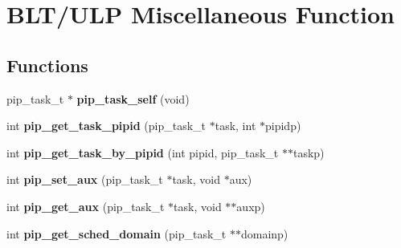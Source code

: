 \hypertarget{group__ulp-6-misc}{\section{B\-L\-T/\-U\-L\-P Miscellaneous Function}
\label{group__ulp-6-misc}
}
\subsection*{Functions}
\begin{DoxyCompactItemize}
\item 
\hypertarget{group__ulp-6-misc_gaf09a1abfd580696c74d4aa7be8255ad0}{pip\-\_\-task\-\_\-t $\ast$ {\bfseries pip\-\_\-task\-\_\-self} (void)}\label{group__ulp-6-misc_gaf09a1abfd580696c74d4aa7be8255ad0}

\item 
\hypertarget{group__ulp-6-misc_ga14a1b03ec6564885a5dd97dbc27167aa}{int {\bfseries pip\-\_\-get\-\_\-task\-\_\-pipid} (pip\-\_\-task\-\_\-t $\ast$task, int $\ast$pipidp)}\label{group__ulp-6-misc_ga14a1b03ec6564885a5dd97dbc27167aa}

\item 
\hypertarget{group__ulp-6-misc_ga147decca4226959d822b73b7c31a4465}{int {\bfseries pip\-\_\-get\-\_\-task\-\_\-by\-\_\-pipid} (int pipid, pip\-\_\-task\-\_\-t $\ast$$\ast$taskp)}\label{group__ulp-6-misc_ga147decca4226959d822b73b7c31a4465}

\item 
\hypertarget{group__ulp-6-misc_gacfd984207deedf86edddbb72c5d4e883}{int {\bfseries pip\-\_\-set\-\_\-aux} (pip\-\_\-task\-\_\-t $\ast$task, void $\ast$aux)}\label{group__ulp-6-misc_gacfd984207deedf86edddbb72c5d4e883}

\item 
\hypertarget{group__ulp-6-misc_ga8bf51911ca0b18340b29fae90ab59b03}{int {\bfseries pip\-\_\-get\-\_\-aux} (pip\-\_\-task\-\_\-t $\ast$task, void $\ast$$\ast$auxp)}\label{group__ulp-6-misc_ga8bf51911ca0b18340b29fae90ab59b03}

\item 
\hypertarget{group__ulp-6-misc_ga32119e3a41a4073b52ade76bf87a5589}{int {\bfseries pip\-\_\-get\-\_\-sched\-\_\-domain} (pip\-\_\-task\-\_\-t $\ast$$\ast$domainp)}\label{group__ulp-6-misc_ga32119e3a41a4073b52ade76bf87a5589}

\end{DoxyCompactItemize}


